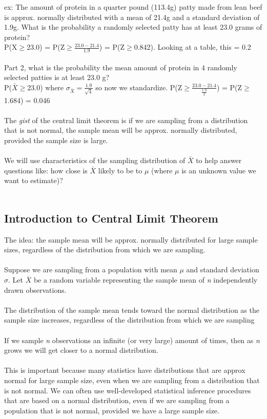 \documentclass[12pt, a4paper]{article}
\begin{document}
	ex: The amount of protein in a quarter pound (113.4g) patty made from lean beef is approx. normally distributed with a mean of 21.4g and a standard deviation of 1.9g. What is the probability a randomly selected patty has at least 23.0 grams of protein? \\
	P(X$\geq$23.0) = P(Z$\geq \frac{23.0-21.4}{1.9}$) = P(Z$\geq$0.842). Looking at a table, this = 0.2 \\~\\
	Part 2, what is the probability the mean amount of protein in 4 randomly selected patties is at least 23.0 g? \\
	P($\bar{X}\geq 23.0$) where $\sigma_{\bar{X}} = \frac{1.9}{\sqrt{4}}$ so now we standardize. P(Z$\geq \frac{23.0-21.4}{\frac{1.9}{2}}$) = P(Z$\geq$1.684) = 0.046 \\~\\
	The \textit{gist} of the central limit theorem is if we are sampling from a distribution that is not normal, the sample mean will be approx. normally distributed, provided the sample size is large. \\~\\
	We will use characteristics of the sampling distribution of $\bar{X}$ to help answer questions like: how close is $\bar{X}$ likely to be to $\mu$ (where $\mu$ is an unknown value we want to estimate)? \\~\\
	
	\subsection{Introduction to Central Limit Theorem}
	The idea: the sample mean will be approx. normally distributed for large sample sizes, regardless of the distribution from which we are sampling. \\~\\
	Suppose we are sampling from a population with mean $\mu$ and standard deviation $\sigma$. Let $\bar{X}$ be a random variable representing the sample mean of \textit{n} independently drawn observations. \\~\\
	The distribution of the sample mean tends toward the normal distribution as the sample size increases, regardless of the distribution from which we are sampling \\~\\
	If we sample \textit{n} observations an infinite (or very large) amount of times, then as \textit{n} grows we will get closer to a normal distribution. \\~\\
	This is important because many statistics have distributions that are approx normal for large sample size, even when we are sampling from a distribution that is not normal. We can often use well-developed statistical inference procedures that are based on a normal distribution, even if we are sampling from a population that is not normal, provided we have a large sample size. \newpage
	
\end{document}
